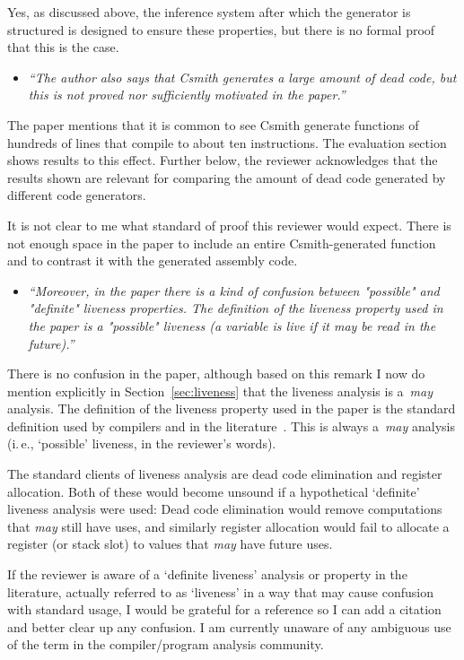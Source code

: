 \documentclass{llncs}
\begin{document}
Yes, as discussed above, the inference system after which the generator is
structured is designed to ensure these properties, but there is no formal
proof that this is the case.

\begin{itemize}\item
\emph{``The author also says that Csmith generates a large amount of dead
code, but this is not proved nor sufficiently motivated in the paper.''}
\end{itemize}

The paper mentions that it is common to see Csmith generate functions of
hundreds of lines that compile to about ten instructions. The evaluation
section shows results to this effect. Further below, the reviewer
acknowledges that the results shown are relevant for comparing the amount of
dead code generated by different code generators.

It is not clear to me what standard of proof this reviewer would expect.
There is not enough space in the paper to include an entire Csmith-generated
function and to contrast it with the generated assembly code.

\begin{itemize}\item
\emph{``Moreover, in the paper there is a kind of confusion between
"possible" and "definite" liveness properties. The definition of the
liveness property used in the paper is a "possible" liveness (a variable is
live if it may be read in the future).''}
\end{itemize}

There is no confusion in the paper, although based on this remark I now do
mention explicitly in Section~\ref{sec:liveness} that the liveness analysis
is a~\emph{may} analysis. The definition of the liveness property used in
the paper is the standard definition used by compilers and in the
literature~\cite{nielson.etal-1999}. This is always a~\emph{may}
analysis (i.\,e., `possible' liveness, in the reviewer's words).

The standard clients of liveness analysis are dead code elimination and
register allocation. Both of these would become unsound if a hypothetical
`definite' liveness analysis were used: Dead code elimination would
remove computations that \emph{may} still have uses, and similarly register
allocation would fail to allocate a register (or stack slot) to values that
\emph{may} have future uses.

If the reviewer is aware of a `definite liveness' analysis or property in
the literature, actually referred to as `liveness' in a way that may cause
confusion with standard usage, I would be grateful for a reference so I can
add a citation and better clear up any confusion. I am currently unaware of
any ambiguous use of the term in the compiler/program analysis community.
\end{document}

